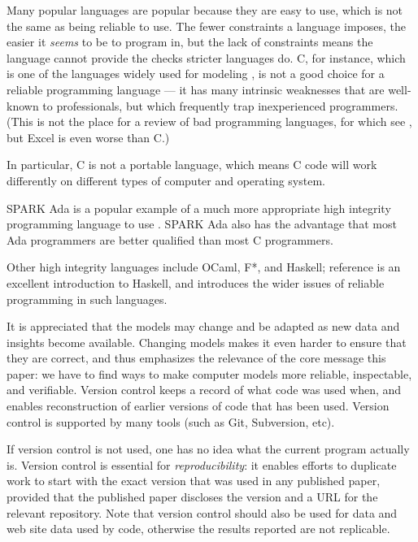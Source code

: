 \documentclass[10pt,a4paper]{article}
\begin{document}
Many popular languages are popular because they are easy to use, which is not the same as being reliable to use. The fewer constraints a language imposes, the easier it \emph{seems\/} to be to program in, but the lack of constraints means the language cannot provide the checks stricter languages do. C, for instance, which is one of the languages widely used for modeling \cite{tweet,plos}, is not a good choice for a reliable programming language --- it has many intrinsic weaknesses that are well-known to professionals, but which frequently trap inexperienced programmers. (This is not the place for a review of bad programming languages, for which see \cite{heedless}, but Excel is even worse than C\@.) 

In particular, C is not a portable language, which means C code will work differently on different types of computer and operating system. 

SPARK Ada is a popular example of a much more appropriate high integrity programming language to use \cite{spark}. SPARK Ada also has the advantage that most Ada programmers are better qualified than most C programmers. 

Other high integrity languages include  OCaml, F*, and Haskell; reference \cite{haskell} is an excellent introduction to Haskell, and introduces the wider issues of reliable programming in such languages.

It is appreciated that the models may change and be adapted as new data and insights become available. Changing models makes it even harder to ensure that they are correct, and thus emphasizes the relevance of the core message this paper: we have to find ways to make computer models more reliable, inspectable, and verifiable. Version control keeps a record of what code was used when, and enables reconstruction of earlier versions of code that has been used. Version control is supported by many tools (such as Git, Subversion, etc). 

If version control is not used, one has no idea what the current program actually is. {Version control is essential for \emph{reproducibility\/}: \cite{basic-reproducibilty,reproducibility} it enables efforts to duplicate work to start with the exact version that was used in any published paper, provided that the published paper discloses the version and a URL for the relevant repository. Note that version control should also be used for data and web site data used by code, otherwise the results reported are not replicable.}
\end{document}
